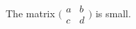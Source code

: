 \documentclass[12pt]{article}
\begin{document}
The matrix $\bigl(\begin{smallmatrix} a & b \\ c & d \end{smallmatrix}\bigr)$ is small.
\end{document}
